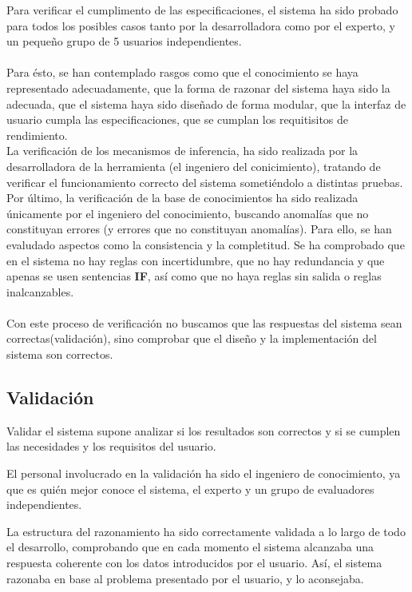 Para verificar el cumplimento de las especificaciones, el sistema ha sido probado para todos los posibles casos tanto por la desarrolladora como por el experto, y un pequeño grupo de 5 usuarios independientes.\\ \\Para ésto, se han contemplado rasgos como que el conocimiento se haya representado adecuadamente,  que la forma de razonar del sistema haya sido la adecuada, que el sistema haya sido diseñado de forma modular, que la interfaz de usuario cumpla las especificaciones, que se cumplan los requitisitos de rendimiento.
\\
La verificación de los mecanismos de inferencia, ha sido realizada por la desarrolladora de la herramienta (el ingeniero del conicimiento), tratando de verificar el funcionamiento correcto del sistema sometiéndolo a distintas pruebas.
\\
Por último, la verificación de la base de conocimientos ha sido realizada únicamente por el ingeniero del conocimiento, buscando anomalías que no constituyan errores (y errores que no constituyan anomalías). Para ello, se han evaludado aspectos como la consistencia y la completitud. Se ha comprobado que en el sistema no hay reglas con incertidumbre, que no hay redundancia y que apenas se usen sentencias \textbf{IF}, así como que no haya reglas sin salida o reglas inalcanzables.\\ \\Con este proceso de verificación no buscamos que las respuestas del sistema sean correctas(validación), sino comprobar que el diseño y la implementación del sistema son correctos. \\
\subsection{Validación}
\label{sub:Validación}

Validar el sistema supone analizar si los resultados son correctos y si se cumplen las necesidades y los requisitos del usuario.

El personal involucrado en la validación ha sido el ingeniero de conocimiento, ya que es quién mejor conoce el sistema, el experto y un grupo de evaluadores independientes.

La estructura del razonamiento ha sido correctamente validada a lo largo de todo el desarrollo, comprobando que en cada momento el sistema alcanzaba una respuesta coherente con los datos introducidos por el usuario. Así, el sistema razonaba en base al problema presentado por el usuario, y lo aconsejaba.

